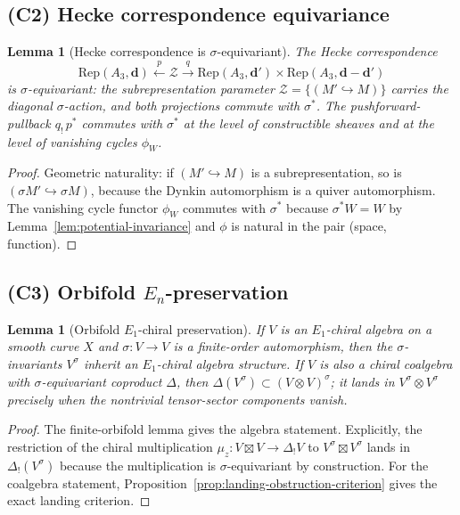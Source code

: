 \documentclass[11pt]{amsart}
\newtheorem{lemma}[theorem]{Lemma}
\theoremstyle{definition}
\theoremstyle{remark}
\begin{document}
\subsection*{(C2) Hecke correspondence equivariance}

\begin{lemma}[Hecke correspondence is $\sigma$-equivariant]%
\label{lem:hecke-equivariance}%
The Hecke correspondence
\[
  \mathrm{Rep}(A_3, \mathbf{d})
  \xleftarrow{\;p\;} \mathcal{Z}
  \xrightarrow{\;q\;}
  \mathrm{Rep}(A_3, \mathbf{d}')\times \mathrm{Rep}(A_3, \mathbf{d}-\mathbf{d}')
\]
is $\sigma$-equivariant: the subrepresentation parameter $\mathcal{Z}
= \{(M' \hookrightarrow M)\}$ carries the diagonal
$\sigma$-action, and both projections commute with $\sigma^*$. The
pushforward-pullback $q_!\, p^*$ commutes with $\sigma^*$ at the level
of constructible sheaves and at the level of vanishing cycles
$\phi_W$.
\end{lemma}

\begin{proof}
Geometric naturality: if $(M' \hookrightarrow M)$ is a
subrepresentation, so is $(\sigma M' \hookrightarrow \sigma M)$,
because the Dynkin automorphism is a quiver automorphism. The
vanishing cycle functor $\phi_W$ commutes with $\sigma^*$ because
$\sigma^*W = W$ by Lemma~\ref{lem:potential-invariance} and
$\phi$ is natural in the pair (space, function).
\end{proof}

\subsection*{(C3) Orbifold $E_n$-preservation}

\begin{lemma}[Orbifold $E_1$-chiral preservation]%
\label{lem:orbifold-E1}%
If $V$ is an $E_1$-chiral algebra on a smooth curve $X$ and
$\sigma\colon V\to V$ is a finite-order automorphism, then the
$\sigma$-invariants $V^\sigma$ inherit an $E_1$-chiral algebra
structure. If $V$ is also a chiral coalgebra with
$\sigma$-equivariant coproduct $\Delta$, then
$\Delta(V^\sigma)\subset (V\otimes V)^\sigma$; it lands in
$V^\sigma\otimes V^\sigma$ precisely when the nontrivial tensor-sector
components vanish.
\end{lemma}

\begin{proof}
The finite-orbifold lemma gives the algebra statement. Explicitly, the
restriction
of the chiral multiplication $\mu_z\colon V \boxtimes V \to
\Delta_! V$ to $V^\sigma \boxtimes V^\sigma$ lands in
$\Delta_!(V^\sigma)$ because the multiplication is
$\sigma$-equivariant by construction. For the coalgebra statement,
Proposition~\ref{prop:landing-obstruction-criterion} gives the exact
landing criterion.
\end{proof}
\end{document}
